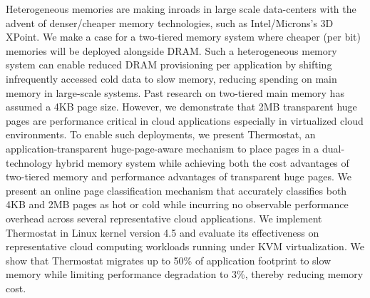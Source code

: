 Heterogeneous memories are making inroads in large scale data-centers with the
advent of denser/cheaper memory technologies, such as Intel/Microns’s 3D XPoint.
We make a case for a two-tiered memory system where cheaper (per bit) memories
will be deployed alongside DRAM. Such a heterogeneous memory system can enable
reduced DRAM provisioning per application by shifting infrequently accessed cold
data to slow memory, reducing spending on main memory in large-scale systems.
Past research on two-tiered main memory has assumed a 4KB page size.  However,
we demonstrate that 2MB transparent huge pages are performance critical in
cloud applications especially in virtualized cloud environments.  To enable such
deployments, we present Thermostat, an application-transparent huge-page-aware
mechanism to place pages in a dual-technology hybrid memory system while
achieving both the cost advantages of two-tiered memory and performance
advantages of transparent huge pages.  We present an online page classification
mechanism that accurately classifies both 4KB and 2MB pages as hot or cold while
incurring no observable performance overhead across several representative cloud
applications. We implement Thermostat in Linux kernel version 4.5 and evaluate
its effectiveness on representative cloud computing workloads running under KVM
virtualization. We show that Thermostat migrates up to 50\% of application
footprint to slow memory while limiting performance degradation to 3\%, thereby
reducing memory cost.

